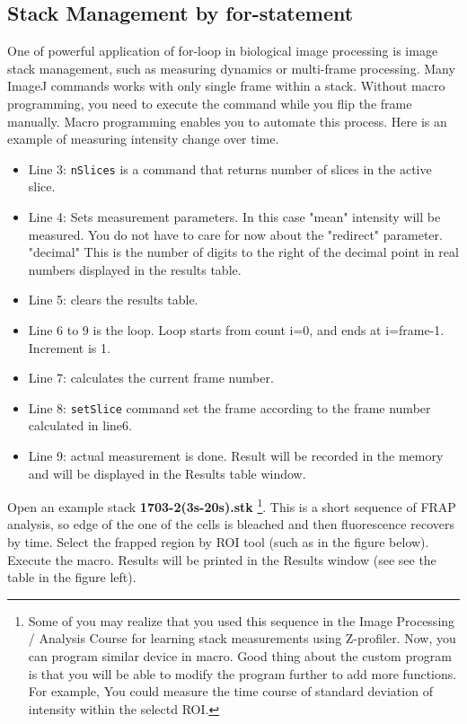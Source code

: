 \documentclass[11pt,a4paper,oneside]{report}
\newcommand{\ilcom}[1]{\texttt{\small#1}}
\begin{document}
\subsection{Stack Management by for-statement}
One of powerful application of for-loop in biological image processing is image stack management, 
such as measuring dynamics or multi-frame processing. 
Many ImageJ commands works with only single frame within a stack. 
Without macro programming, you need to execute the command while you flip the frame manually. 
Macro programming enables you to automate this process. 
Here is an example of measuring intensity change over time. 

\begin{itemize}
\item Line 3: \ilcom{nSlices} is a command that returns number of slices in the active slice. 

\item Line 4: Sets measurement parameters. In this case "mean" intensity will be measured. 
You do not have to care for now about the "redirect" parameter. "decimal" This is the number of digits to 
the right of the decimal point in real numbers displayed in the results table. 

\item Line 5: clears the results table. 

\item Line 6 to 9 is the loop. Loop starts from count i=0, and ends at i=frame-1. Increment is 1.  

\item Line 7: calculates the current frame number. 

\item Line 8: \ilcom{setSlice} command set the frame according to the frame number calculated in line6. 

\item Line 9:  actual measurement is done. 
Result will be recorded in the memory and will be displayed in the Results table window. 
\end{itemize}

Open an example stack \textbf{1703-2(3s-20s).stk}
\footnote{Some of you may realize that you used this sequence 
in the Image Processing / Analysis Course for learning 
stack measurements using Z-profiler. Now, you can program similar 
device in macro. Good thing about the custom program 
is that you will be able to modify the program further to add more functions.
For example, You could measure the time course of standard deviation of
intensity within the selectd ROI.}. This is a short sequence of FRAP analysis,
so edge of the one of the cells is bleached and then fluorescence recovers by time. 
Select the frapped region by ROI tool (such as in the figure below). 
Execute the macro. Results will be printed in the Results window (see see the table in the figure left). 
\end{document}
